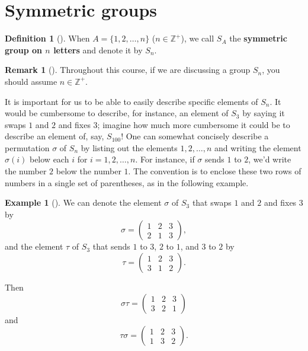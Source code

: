 \documentclass[10pt,]{book}
\newcommand{\terminology}[1]{\textbf{#1}}
\theoremstyle{plain}
\theoremstyle{definition}
\newtheorem{definition}[theorem]{Definition}
\theoremstyle{definition}
\newtheorem{remark}[theorem]{Remark}
\theoremstyle{definition}
\newtheorem{example}[theorem]{Example}
\theoremstyle{definition}
\numberwithin{equation}{section}
\def\Z{\mathbb{Z}}
\newcommand{\amp}{&}
\begin{document}
\section[{Symmetric groups}]{Symmetric groups}\label{section-18}
\begin{definition}[{}]\label{definition-46}
When \(A=\{1,2,\ldots, n\}\) (\(n\in \Z^+\)), we call \(S_A\) the \terminology{symmetric group on \(n\) letters} and denote it by \(S_n\).%
\end{definition}
\begin{remark}[]\label{remark-25}
Throughout this course, if we are discussing a group \(S_n\), you should assume \(n\in \Z^+\).%
\end{remark}
It is important for us to be able to easily describe specific elements of \(S_n\). It would be cumbersome to describe, for instance, an element of \(S_3\) by saying it swaps \(1\) and \(2\) and fixes \(3\); imagine how much more cumbersome it could be to describe an element of, say, \(S_{100}\)! One can somewhat concisely describe a permutation \(\sigma\) of \(S_n\) by listing out the elements \(1,2,\ldots,n\) and writing the element \(\sigma(i)\) below each \(i\) for \(i=1,2,\ldots, n\). For instance, if \(\sigma\) sends \(1\) to \(2\), we'd write the number \(2\) below the number \(1\). The convention is to enclose these two rows of numbers in a single set of parentheses, as in the following example.%
\begin{example}[]\label{nocommute}
We can denote the element \(\sigma\) of \(S_3\) that swaps \(1\) and \(2\) and fixes \(3\) by%
\begin{equation*}
\sigma = \begin{pmatrix}1\amp 2\amp 3\\ 2\amp 1\amp 3
\end{pmatrix},
\end{equation*}
and the element \(\tau\) of \(S_3\) that sends \(1\) to \(3\), \(2\) to \(1\), and \(3\) to \(2\) by%
\begin{equation*}
\tau =\begin{pmatrix}1\amp 2\amp 3\\ 3\amp 1\amp 2
\end{pmatrix}.
\end{equation*}
%
\par
Then%
\begin{equation*}
\sigma\tau = \begin{pmatrix}1\amp 2\amp 3\\ 3\amp 2\amp 1
\end{pmatrix}
\end{equation*}
and%
\begin{equation*}
\tau\sigma = \begin{pmatrix}1\amp 2\amp 3\\ 1\amp 3\amp 2
\end{pmatrix}.
\end{equation*}
%
\end{example}
\end{document}
